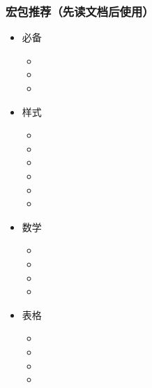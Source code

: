 \begin{frame}[fragile]
  \frametitle{宏包推荐（\textbf{先读文档}后使用）}
  \setlength{\leftmarginii}{1.5em}
  \vspace{-1.5em}
  \begin{multicols}{3}
    \begin{itemize}
      \item 必备
  
        \begin{itemize}
          \item {}
          \item {}
          \item {}
        \end{itemize}
  
      \item 样式
  
        \begin{itemize}
          \item {}
          \item {}
          \item {}
          \item {}
          \item {}
          \item {}
        \end{itemize}
  
      \item 数学
  
        \begin{itemize}
          \item {}
          \item {}
          \item {}
          \item {}
        \end{itemize}
  
      \item 表格
  
        \begin{itemize}
          \item {}
          \item {}
          \item {}
          \item {}
        \end{itemize}
  

\end{itemize}
\end{multicols}
\end{frame}
